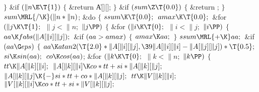 \4${}\}{}$\2\6
\&{if} ${}(\|n\E\T{1}){}$\5
${}\{{}$\1\6
\&{return} \|A[][];\6
\4${}\}{}$\2\6
\&{if} ${}(\\{sum}\Z\T{0.0}){}$\5
${}\{{}$\1\6
\&{return} ;\6
\4${}\}{}$\2\6
${}\\{sum}\MRL{{/}{\K}}(\|n*\|n){}$;\6
\&{do}\5
${}\{{}$\1\6
${}\\{ssum}\K\T{0.0};{}$\6
${}\\{amax}\K\T{0.0};{}$\6
\&{for} ${}(\|j\K\T{1};{}$ ${}\|j<\|n;{}$ ${}\|j\PP){}$\5
${}\{{}$\1\6
\&{for} ${}(\|i\K\T{0};{}$ ${}\|i<\|j;{}$ ${}\|i\PP){}$\5
${}\{{}$\1\6
${}\\{aa}\K\\{fabs}(\|A[\|i][\|j]);{}$\6
\&{if} ${}(\\{aa}>\\{amax}){}$\5
${}\{{}$\1\6
${}\\{amax}\K\\{aa};{}$\6
\4${}\}{}$\2\6
${}\\{ssum}\MRL{+{\K}}\\{aa};{}$\6
\&{if} ${}(\\{aa}\G\\{eps}){}$\5
${}\{{}$\1\6
${}\\{aa}\K\\{atan2}(\T{2.0}*\|A[\|i][\|j],\39\|A[\|i][\|i]-\|A[\|j][\|j])*%
\T{0.5};{}$\6
${}\\{si}\K\\{sin}(\\{aa});{}$\6
${}\\{co}\K\\{cos}(\\{aa}){}$;\6
\&{for} ${}(\|k\K\T{0};{}$ ${}\|k<\|n;{}$ ${}\|k\PP){}$\5
${}\{{}$\1\6
${}\\{tt}\K\|A[\|k][\|i];{}$\6
${}\|A[\|k][\|i]\K\\{co}*\\{tt}+\\{si}*\|A[\|k][\|j];{}$\6
${}\|A[\|k][\|j]\K{-}\\{si}*\\{tt}+\\{co}*\|A[\|k][\|j];{}$\6
${}\\{tt}\K\|V[\|k][\|i];{}$\6
${}\|V[\|k][\|i]\K\\{co}*\\{tt}+\\{si}*\|V[\|k][\|j];{}$\6
